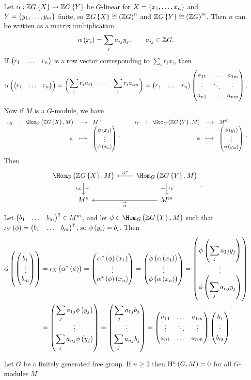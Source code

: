 Let $ \alpha : \ZZ G\cbr{X} \to \ZZ G\cbr{Y} $ be $ G $-linear for $ X = \cbr{x_1, \dots, x_n} $ and $ Y = \cbr{y_1, \dots, y_m} $ finite, so $ \ZZ G\cbr{X} \cong \br{\ZZ G}^n $ and $ \ZZ G\cbr{Y} \cong \br{\ZZ G}^m $. Then $ \alpha $ can be written as a matrix multiplication
$$ \alpha\br{x_i} = \sum_j a_{ij}y_j, \qquad a_{ij} \in \ZZ G. $$
If $ \onebythree{r_1}{\dots}{r_n} $ is a row vector corresponding to $ \sum_i r_ix_i $, then
$$ \alpha\br{\onebythree{r_1}{\dots}{r_n}} = \onebythree{\displaystyle\sum_i r_ia_{i1}}{\dots}{\displaystyle\sum_i r_ia_{im}} = \onebythree{r_1}{\dots}{r_n}\threebythree{a_{11}}{\dots}{a_{1m}}{\vdots}{\ddots}{\vdots}{a_{n1}}{\dots}{a_{nm}}. $$
Now if $ M $ is a $ G $-module, we have
$$ \function[\iota_X]{\Hom_G\br{\ZZ G\cbr{X}, M}}{M^n}{\psi}{\threebyone{\psi\br{x_1}}{\vdots}{\psi\br{x_n}}}, \qquad \function[\iota_Y]{\Hom_G\br{\ZZ G\cbr{Y}, M}}{M^m}{\phi}{\threebyone{\phi\br{y_1}}{\vdots}{\phi\br{y_m}}}. $$
Then
$$
\begin{tikzcd}
\Hom_G\br{\ZZ G\cbr{X}, M} \arrow{d}{\sim}[swap]{\iota_X} & \Hom_G\br{\ZZ G\cbr{Y}, M} \arrow{l}[swap]{\alpha^*} \arrow{d}{\iota_Y}[swap]{\sim} \\
M^n & M^m \arrow{l}{\widetilde{\alpha}}
\end{tikzcd}.
$$
Let $ \onebythree{b_1}{\dots}{b_m}^\intercal \in M^m $, and let $ \phi \in \Hom_G\br{\ZZ G\cbr{Y}, M} $ such that $ \iota_Y\br{\phi} = \onebythree{b_1}{\dots}{b_m}^\intercal $, so $ \phi\br{y_i} = b_i $. Then
\begin{align*}
\widetilde{\alpha}\br{\threebyone{b_1}{\vdots}{b_m}}
& = \iota_X\br{\alpha^*\br{\phi}}
= \threebyone{\alpha^*\br{\phi}\br{x_1}}{\vdots}{\alpha^*\br{\phi}\br{x_n}}
= \threebyone{\phi\br{\alpha\br{x_1}}}{\vdots}{\phi\br{\alpha\br{x_n}}}
= \threebyone{\phi\br{\displaystyle\sum_j a_{1j}y_j}}{\vdots}{\phi\br{\displaystyle\sum_j a_{nj}y_j}} \\
& = \threebyone{\displaystyle\sum_j a_{1j}\phi\br{y_j}}{\vdots}{\displaystyle\sum_j a_{nj}\phi\br{y_j}}
= \threebyone{\displaystyle\sum_j a_{1j}b_j}{\vdots}{\displaystyle\sum_j a_{nj}b_j}
= \threebythree{a_{11}}{\dots}{a_{1m}}{\vdots}{\ddots}{\vdots}{a_{n1}}{\dots}{a_{nm}}\threebyone{b_1}{\vdots}{b_m}.
\end{align*}

\pagebreak

\begin{proposition}
Let $ G $ be a finitely generated free group. If $ n \ge 2 $ then $ \H^n\br{G, M} = 0 $ for all $ G $-modules $ M $.
\end{proposition}

